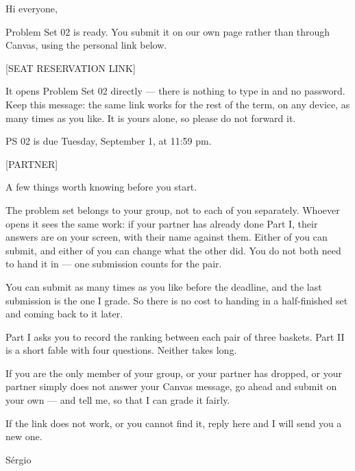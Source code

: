 Hi everyone,

Problem Set 02 is ready. You submit it on our own page rather than through
Canvas, using the personal link below.

[SEAT RESERVATION LINK]

It opens Problem Set 02 directly — there is nothing to type in and no password.
Keep this message: the same link works for the rest of the term, on any device,
as many times as you like. It is yours alone, so please do not forward it.

PS 02 is due Tuesday, September 1, at 11:59 pm.

[PARTNER]

A few things worth knowing before you start.

The problem set belongs to your group, not to each of you separately. Whoever
opens it sees the same work: if your partner has already done Part I, their
answers are on your screen, with their name against them. Either of you can
submit, and either of you can change what the other did. You do not both need
to hand it in — one submission counts for the pair.

You can submit as many times as you like before the deadline, and the last
submission is the one I grade. So there is no cost to handing in a half-finished
set and coming back to it later.

Part I asks you to record the ranking between each pair of three baskets.
Part II is a short fable with four questions. Neither takes long.

If you are the only member of your group, or your partner has dropped, or your
partner simply does not answer your Canvas message, go ahead and submit on your
own — and tell me, so that I can grade it fairly.

If the link does not work, or you cannot find it, reply here and I will send you
a new one.

Sérgio
